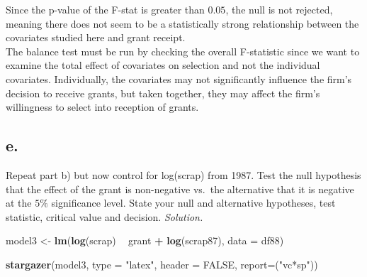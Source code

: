\documentclass[
]{article}
\newenvironment{Shaded}{\begin{snugshade}}{\end{snugshade}}
\newcommand{\DataTypeTok}[1]{\textcolor[rgb]{0.13,0.29,0.53}{#1}}
\newcommand{\DecValTok}[1]{\textcolor[rgb]{0.00,0.00,0.81}{#1}}
\newcommand{\KeywordTok}[1]{\textcolor[rgb]{0.13,0.29,0.53}{\textbf{#1}}}
\newcommand{\NormalTok}[1]{#1}
\newcommand{\OperatorTok}[1]{\textcolor[rgb]{0.81,0.36,0.00}{\textbf{#1}}}
\newcommand{\OtherTok}[1]{\textcolor[rgb]{0.56,0.35,0.01}{#1}}
\newcommand{\StringTok}[1]{\textcolor[rgb]{0.31,0.60,0.02}{#1}}
\begin{document}
Since the p-value of the F-stat is greater than \(0.05\), the null is
not rejected, meaning there does not seem to be a statistically strong
relationship between the covariates studied here and grant receipt.\\
The balance test must be run by checking the overall F-statistic since
we want to examine the total effect of covariates on selection and not
the individual covariates. Individually, the covariates may not
significantly influence the firm's decision to receive grants, but taken
together, they may affect the firm's willingness to select into
reception of grants.

\hypertarget{e.}{%
\subsection{e.}\label{e.}}

Repeat part b) but now control for log(scrap) from 1987. Test the null
hypothesis that the effect of the grant is non-negative vs.~the
alternative that it is negative at the \(5\%\) significance level. State
your null and alternative hypotheses, test statistic, critical value and
decision. \newline \newline \emph{Solution.}

\begin{Shaded}
\end{Shaded}

\begin{Shaded}
\begin{Highlighting}[]
\NormalTok{model3 <-}\StringTok{ }\KeywordTok{lm}\NormalTok{(}\KeywordTok{log}\NormalTok{(scrap) }\OperatorTok{~}\StringTok{ }\NormalTok{grant }\OperatorTok{+}\StringTok{ }\KeywordTok{log}\NormalTok{(scrap87), }\DataTypeTok{data =}\NormalTok{ df88)}
\end{Highlighting}
\end{Shaded}

\newpage

\begin{Shaded}
\begin{Highlighting}[]
\KeywordTok{stargazer}\NormalTok{(model3, }\DataTypeTok{type =} \StringTok{"latex"}\NormalTok{, }\DataTypeTok{header =} \OtherTok{FALSE}\NormalTok{, }\DataTypeTok{report=}\NormalTok{(}\StringTok{"vc*sp"}\NormalTok{))}
\end{Highlighting}
\end{Shaded}
\end{document}

